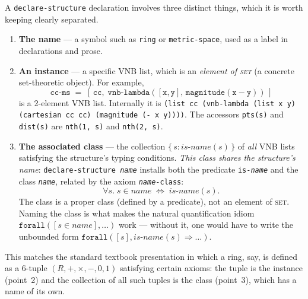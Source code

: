 \begin{remark}
A \texttt{declare-structure} declaration involves three distinct things,
which it is worth keeping clearly separated.
\begin{enumerate}
\item \textbf{The name} --- a symbol such as \texttt{ring} or
  \texttt{metric-space}, used as a label in declarations and prose.
\item \textbf{An instance} --- a specific VNB list, which is an
  \emph{element of \textsc{set}} (a concrete set-theoretic object).
  For example,
  \[
    \mathtt{cc\text{-}ms} \;=\;
      [\,\mathtt{cc},\;\mathtt{vnb\text{-}lambda}([\mathtt{x},\mathtt{y}],\,
      \mathtt{magnitude}(\mathtt{x}-\mathtt{y}))\,]
  \]
  is a 2-element VNB list.  Internally it is \texttt{(list cc (vnb-lambda
  (list x y) (cartesian cc cc) (magnitude (- x y))))}.  The accessors \texttt{pts(s)} and
  \texttt{dist(s)} are \texttt{nth(1,~s)} and \texttt{nth(2,~s)}.
\item \textbf{The associated class} --- the collection
  $\{\,s : \mathit{is\text{-}name}(s)\,\}$ of \emph{all} VNB lists
  satisfying the structure's typing conditions.  \emph{This class
  shares the structure's name}: \texttt{declare-structure \textit{name}}
  installs both the predicate \texttt{is-\textit{name}} and the class
  \texttt{\textit{name}}, related by the axiom \texttt{\textit{name}-class}:
  \[
    \forall s.\; s \in \mathit{name} \;\Leftrightarrow\; \mathit{is\text{-}name}(s).
  \]
  The class is a proper class (defined by a predicate), not an
  element of \textsc{set}.  Naming the class is what makes the
  natural quantification idiom
  $\texttt{forall}([s \in \mathit{name}], \ldots)$
  work --- without it, one would have to write the unbounded form
  $\texttt{forall}([s], \mathit{is\text{-}name}(s) \Rightarrow \ldots)$.
\end{enumerate}
This matches the standard textbook presentation in which a ring, say,
is defined as a 6-tuple $(R,+,\times,-,0,1)$ satisfying certain axioms:
the tuple is the instance (point~2) and the collection of all such tuples
is the class (point~3), which has a name of its own.
\end{remark}

